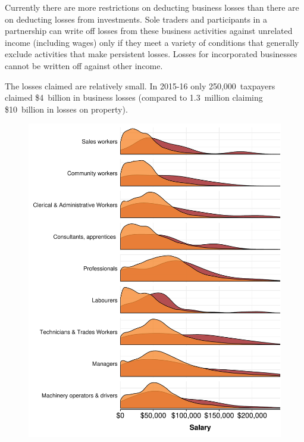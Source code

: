 \documentclass{grattan}\usepackage[]{graphicx}\usepackage[]{color}
\begin{document}
Currently there are more restrictions on deducting business losses than there are on deducting losses from investments. Sole traders and participants in a partnership can write off losses from these business activities against unrelated income (including wages) only if they meet a variety of conditions that generally exclude activities that make persistent losses.  Losses for incorporated businesses cannot be written off against other income. 



The losses claimed are relatively small. In 2015-16 only 250,000~taxpayers claimed \$4~billion in business losses (compared to 1.3~million claiming \$10~billion in losses on property).

\TBD{\dots}



\begin{figure}











\includegraphics[width=\columnwidth]{CGT-NG-atlas//density-salary-by-PP-losses-1}
\end{figure}
\end{document}
